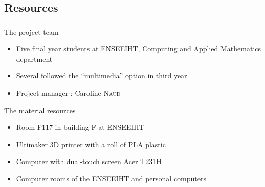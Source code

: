 \documentclass{beamer}
\begin{document}
\subsection{Resources}
\begin{frame}
	\frametitle{}
	
	\begin{block}{The project team}
		\begin{itemize}
		\item Five final year students at ENSEEIHT, Computing and Applied Mathematics department
		\item Several followed the “multimedia” option in third year
		\item Project manager : Caroline \textsc{Naud}
		\end{itemize}
    \end{block}
    
    \begin{block}{The material resources}
    	\begin{itemize}
		\item Room F117 in building F at ENSEEIHT
    	\item Ultimaker 3D printer with a roll of PLA plastic
    	\item Computer with dual-touch screen Acer T231H
    	\item Computer rooms of the ENSEEIHT and personal computers
		\end{itemize}
    \end{block}
      
\end{frame}
\end{document}
